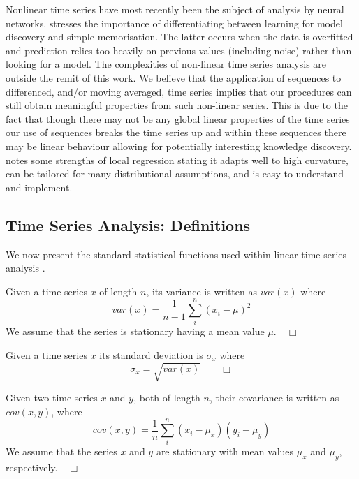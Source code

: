 Nonlinear time series have most recently been the subject of analysis
by neural networks. \cite{wg94} stresses the importance of
differentiating between learning for model discovery and simple
memorisation. The latter occurs when the data is overfitted and
prediction relies too heavily on previous values (including noise)
rather than looking for a model. The complexities of non-linear time
series analysis are outside the remit of this work. We believe that
the application of sequences to differenced, and/or moving averaged,
time series implies that our
procedures can still obtain meaningful properties from such non-linear series.
This is due to the fact that though there may not be any global linear
properties 
of the time series our use of sequences breaks the time series up and
within these sequences there may be linear behaviour allowing for
potentially interesting knowledge discovery. \cite{cl96b} notes some
strengths of local regression stating it adapts well to high
curvature, can be tailored for many distributional assumptions, and is
easy to understand and implement.

\subsection{Time Series Analysis: Definitions}\label{subsec:tl_tsadefs}

We now present the standard statistical functions used within linear
time series analysis \cite{ko90}.
\begin{definition}[Variance]\label{def:var}
\begin{rm}
Given a time series $x$ of length $n$, its variance is written as
$var(x)$ where
\[
var(x) = \frac{1}{n-1} \sum_i^n (x_i - \mu)^2
\]
We assume that the series is stationary having a mean value $\mu$.$\quad\Box$
\end{rm}
\end{definition}

\begin{definition}\label{def:sd}
\begin{rm}
Given a time series $x$ its standard deviation is $\sigma_x$ where 
\[
\sigma_x = \sqrt{var(x)}\quad\quad\Box
\]
\end{rm}
\end{definition}
\begin{definition}[Covariance]\label{def:covar}
\begin{rm}
Given two time series $x$ and $y$, both of length $n$, their
covariance is written as $cov(x,y)$, where
\[
cov(x,y) = \frac{1}{n} \sum_i^n (x_i - \mu_x) (y_i - \mu_y)
\]
We assume that the series $x$ and $y$ are stationary with mean values
$\mu_x$ and $\mu_y$, respectively.$\quad\Box$
\end{rm}
\end{definition}

